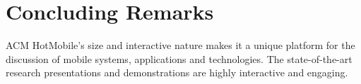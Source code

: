 \section{Concluding Remarks}
\label{sec:conclusion}
ACM HotMobile's size and interactive nature makes it a unique platform for the
discussion of mobile systems, applications and technologies. The state-of-the-art 
research presentations and demonstrations are highly interactive and engaging.

